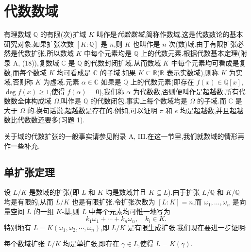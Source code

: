 \section{代数数域}\label{sec:ch1-s1}

有理数域 $\mathbb{Q}$ 的有限(次)扩域 $K$ 叫作是\emph{代数数域},简称作数域,这是代数数论的基本研究对象.如果扩张次数 $[K:\mathbb{Q}]$ 是 $n$,则 $K$ 也叫作是 $n$ 次(数)域.由于有限扩张必然是代数扩张,所以数域 $K$ 中每个元素均是 $\mathbb{Q}$ 上的代数元素.根据代数基本定理(附录 A, (18)),复数域 $\mathbb{C}$ 是 $\mathbb{Q}$ 的代数封闭扩域.从而数域 $K$ 中每个元素均可看成是复数,而每个数域 $K$ 均可看成是 $\mathbb{C}$ 的子域.如果 $K\subseteq\mathbb{R}$($\mathbb{R}$ 表示实数域),则称 $K$ 为实域,否则称 $K$ 为虚域.元素 $\alpha\in\mathbb{C}$ 如果是 $\mathbb{Q}$ 上的代数元素(即存在 $f(x)\in\mathbb{Q}[x]$,$\deg f(x)\geqslant 1$,使得 $f(\alpha)=0$),我们称 $\alpha$ 为代数数,否则便叫作是超越数.所有代数数全体构成域 $\Omega$,叫作是 $\mathbb{Q}$ 的代数闭包.事实上每个数域均是 $\Omega$ 的子域.而 $\mathbb{C}$ 是大于 $\Omega$ 的.换句话说,超越数是存在的.例如,可以证明 $\pi$ 和 $e$ 均是超越数,并且超越数比代数数还要多(习题 1).

关于域的代数扩张的一般事实请参见附录 A, III.在这一节里,我们就数域的情形再作一些补充.

\subsection{单扩张定理}\label{sec:ch1-s1-1}

设 $L/K$ 是数域的扩张(即 $L$ 和 $K$ 均是数域并且 $K\subseteq L$).由于扩张 $L/\mathbb{Q}$ 和 $K/\mathbb{Q}$ 均是有限的,从而 $L/K$ 也是有限扩张.令扩张次数为 $[L:K]=n$,而 $\omega_1,\ldots,\omega_n$ 是向量空间 $L$ 的一组 $K$-基,则 $L$ 中每个元素均可惟一地写为
\[
  k_1\omega_1+\cdots+k_n\omega_n,\quad k_i\in K.
\]
特别地有 $L=K(\omega_1,\omega_2,\cdots,\omega_n)$,即 $L/K$ 是有限生成扩张.我们现在要进一步证明:

\begin{theorem}\label{thm:1.1}
每个数域扩张 $L/K$ 均是单扩张,即存在 $\gamma\in L$,使得 $L=K(\gamma)$.
\end{theorem}

